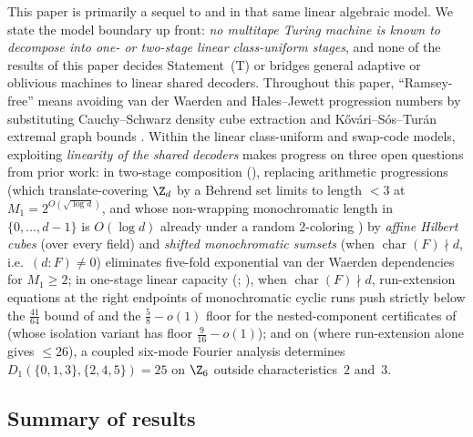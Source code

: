 This paper is primarily a sequel to \cite{SharedDecoders2026} and \cite{SeventeenthPaper2026} in
that same linear algebraic model. We state the model boundary up front: \emph{no multitape Turing
machine is known to decompose into one- or two-stage linear class-uniform stages}, and none of the
results of this paper decides Statement~(T) or bridges general adaptive or oblivious machines to
linear shared decoders. Throughout this paper, ``Ramsey-free'' means avoiding van der Waerden and
Hales--Jewett progression numbers by substituting Cauchy--Schwarz density cube extraction
\cite{Szemeredi1969,GRS1990} and K\H{o}v\'ari--S\'os--Tur\'an extremal graph bounds
\cite{KovariSosTuran1954}. Within the linear class-uniform and swap-code models, exploiting
\emph{linearity of the shared decoders} makes progress on three open questions from prior work: in
two-stage composition (\cite[Section~8]{SharedDecoders2026}), replacing arithmetic progressions (which
translate-covering $\Z_d$ by a Behrend set \cite{Behrend1946} limits to length $< 3$ at
$M_1 = 2^{O(\sqrt{\log d})}$, and whose non-wrapping monochromatic length in $\{0, \dots, d-1\}$ is
$O(\log d)$ already under a random $2$-coloring \cite{GRS1990,AlonSpencer2016}) by \emph{affine Hilbert
cubes} (over every field) and \emph{shifted monochromatic sumsets} (when $\operatorname{char}(F) \nmid d$,
i.e.\ $(d : F) \ne 0$) eliminates five-fold exponential van der Waerden dependencies \cite{Gowers2001} for
$M_1 \ge 2$; in one-stage linear capacity (\cite[Problem~9.1(a)]{SeventeenthPaper2026};
\cite[Section~3 and Appendix~C]{SharedDecoders2026}), when $\operatorname{char}(F) \nmid d$,
run-extension equations at the right endpoints of monochromatic cyclic runs push strictly below the
$\frac{41}{64}$ bound of \cite[Theorem~3.4]{SharedDecoders2026} and the $\frac{5}{8} - o(1)$ floor
for the nested-component certificates of \cite[Theorem~C.6]{SharedDecoders2026} (whose isolation
variant \cite[Theorem~C.7]{SharedDecoders2026} has floor $\frac{9}{16} - o(1)$); and on \cite[Problem~9.1(b)]{SeventeenthPaper2026} (where run-extension alone gives
$\le 26$), a coupled six-mode Fourier analysis determines $D_1(\{0,1,3\},\{2,4,5\}) = 25$ on $\Z_6$
outside characteristics~$2$ and~$3$.

\subsection{Summary of results}\label{sec:results-overview}

